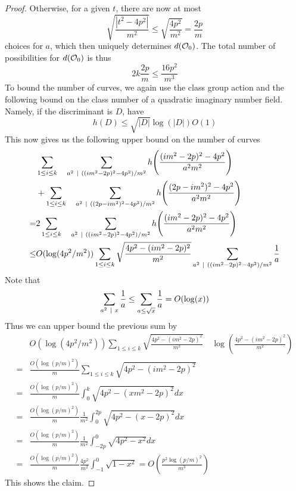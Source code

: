 \begin{proof}
    Otherwise, for a given $t$, there are now at most
    \begin{equation*}
        \sqrt{\frac {|t^2 - 4p^2|} {m^2}} \leq \sqrt{\frac {4p^2} {m^2}} = \frac {2p} m
    \end{equation*}
    choices for $a$, which then uniquely determines $d(\mathcal{O}_0)$.
    The total number of possibilities for $d(\mathcal{O}_0)$ is thus
    \begin{equation*}
        2k \frac {2p} {m} \leq \frac {16p^2} {m^3}
    \end{equation*}
    To bound the number of curves, we again use the class group action and the following bound on the class number of a quadratic imaginary number field.
    Namely, if the discriminant is $D$, have
    \begin{equation*}
        h(D) \leq \sqrt{|D|}\log(|D|) O(1)
    \end{equation*}
    This now gives us the following upper bound on the number of curves
    \begin{align*}
        &\sum_{1 \leq i \leq k} \quad \sum_{a^2 \ \mid \  ((im^2 - 2p)^2 - 4p^2)/m^2} h\Biggl( \frac {(im^2 - 2p)^2 - 4p^2} {a^2m^2} \Biggr) \\
        &+ \sum_{1 \leq i \leq k} \quad \sum_{a^2 \ \mid \  ((2p - im^2)^2 - 4p^2)/m^2} h\Biggl( \frac {(2p - im^2)^2 - 4p^2} {a^2m^2} \Biggr) \\
        =& 2\sum_{1 \leq i \leq k} \quad \sum_{a^2 \ \mid \  ((im^2 - 2p)^2 - 4p^2)/m^2} h\Biggl( \frac {(im^2 - 2p)^2 - 4p^2} {a^2m^2} \Biggr) \\
        \leq& O(\log(4p^2/m^2)) \sum_{1 \leq i \leq k} \sqrt{\frac {4p^2 - (im^2 - 2p)^2} {m^2}} \sum_{a^2 \ \mid \  ((im^2 - 2p)^2 - 4p^2)/m^2} \frac 1 a
    \end{align*}
    Note that
    \begin{align*}
        \sum_{a^2 \ \mid \  x} \frac 1 a \leq \sum_{a \leq \sqrt{x}} \frac 1 a = O(\log(x))
    \end{align*}
    Thus we can upper bound the previous sum by
    \begin{align*}
        &O(\log(4p^2/m^2)) \sum_{1 \leq i \leq k} \sqrt{ \frac {4p^2 - (im^2 - 2p)^2} {m^2}} \quad \log\left( \frac {4p^2 - (im^2 - 2p)^2} {m^2} \right) \\
        =& \frac {O(\log(p/m)^2)} {m} \sum_{1 \leq i \leq k} \sqrt{4p^2 - (im^2 - 2p)^2} \\
        =& \frac {O(\log(p/m)^2)} {m}  \int_0^k \sqrt{4p^2 - (xm^2 - 2p)^2} dx \\
        =& \frac {O(\log(p/m)^2)} {m} \frac 1 {m^2} \int_0^{2p} \sqrt{4p^2 - (x - 2p)^2} dx \\
        =& \frac {O(\log(p/m)^2)} {m} \frac 1 {m^2} \int_{-2p}^0 \sqrt{4p^2 - x^2} dx \\
        =& \frac {O(\log(p/m)^2)} {m} \frac {4p^2} {m^2} \int_{-1}^0 \sqrt{1 - x^2} = O\left( \frac {p^2\log(p/m)^2} {m^3} \right)
    \end{align*}
    This shows the claim.
\end{proof}
